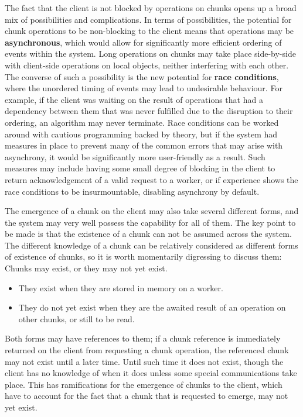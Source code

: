 The fact that the client is not blocked by operations on chunks opens up
a broad mix of possibilities and complications. In terms of
possibilities, the potential for chunk operations to be non-blocking to
the client means that operations may be \textbf{asynchronous}, which
would allow for significantly more efficient ordering of events within
the system. Long operations on chunks may take place side-by-side with
client-side operations on local objects, neither interfering with each
other. The converse of such a possibility is the new potential for
\textbf{race conditions}, where the unordered timing of events may lead
to undesirable behaviour. For example, if the client was waiting on the
result of operations that had a dependency between them that was never
fulfilled due to the disruption to their ordering, an algorithm may
never terminate. Race conditions can be worked around with cautious
programming backed by theory, but if the system had measures in place to
prevent many of the common errors that may arise with asynchrony, it
would be significantly more user-friendly as a result. Such measures may
include having some small degree of blocking in the client to return
acknowledgement of a valid request to a worker, or if experience shows
the race conditions to be insurmountable, disabling asynchrony by
default.

The emergence of a chunk on the client may also take several different
forms, and the system may very well possess the capability for all of
them. The key point to be made is that the existence of a chunk can not
be assumed across the system. The different knowledge of a chunk can be
relatively considered as different forms of existence of chunks, so it
is worth momentarily digressing to discuss them: Chunks may exist, or
they may not yet exist.

\begin{itemize}
  \item
        They exist when they are stored in memory on a worker.
  \item
        They do not yet exist when they are the awaited result of an operation
        on other chunks, or still to be read.
\end{itemize}

Both forms may have references to them; if a chunk reference is
immediately returned on the client from requesting a chunk operation,
the referenced chunk may not exist until a later time. Until such time
it does not exist, though the client has no knowledge of when it does
unless some special communications take place. This has ramifications
for the emergence of chunks to the client, which have to account for the
fact that a chunk that is requested to emerge, may not yet exist.

